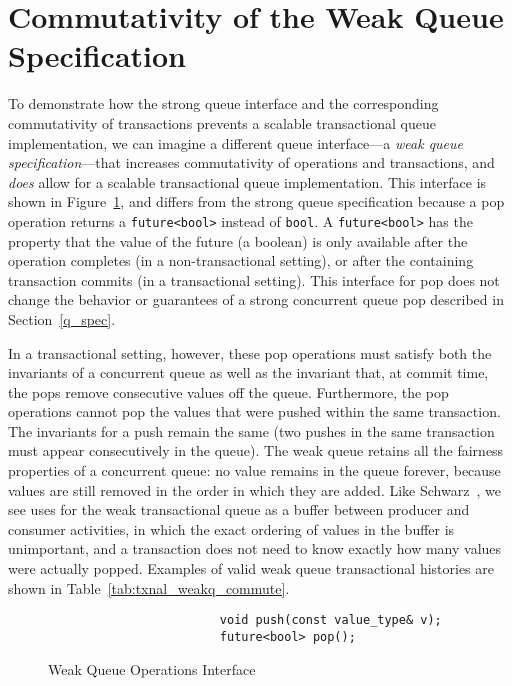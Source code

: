 \section{Commutativity of the Weak Queue Specification}
\label{wqueue}

To demonstrate how the strong queue interface and the corresponding commutativity of transactions prevents a scalable transactional queue implementation, we can imagine a different queue interface---a \emph{weak queue specification}---that increases commutativity of operations and transactions, and \emph{does} allow for a scalable transactional queue implementation. This interface is shown in Figure~\ref{fig:wq_interface}, and differs from the strong queue specification because a pop operation returns a \texttt{future<bool>} instead of \texttt{bool}. A \texttt{future<bool>} has the property that the value of the future (a boolean) is only available after the operation completes (in a non-transactional setting), or after the containing transaction commits (in a transactional setting). This interface for pop does not change the behavior or guarantees of a strong concurrent queue pop described in Section~\ref{q_spec}.
 
In a transactional setting, however, these pop operations must satisfy both the invariants of a concurrent queue as well as the invariant that, at commit time, the pops remove consecutive values off the queue. Furthermore, the pop operations cannot pop the values that were pushed within the same transaction. The invariants for a push remain the same (two pushes in the same transaction must appear consecutively in the queue). 
The weak queue retains all the fairness properties of a concurrent queue: no value remains in the queue forever, because values are still removed in the order in which they are added. Like Schwarz~\cite{schwarz}, we see uses for the weak transactional queue as a buffer between producer and consumer activities, in which the exact ordering of values in the buffer is unimportant, and a transaction does not need to know exactly how many values were actually popped. Examples of valid weak queue transactional histories are shown in Table~\ref{tab:txnal_weakq_commute}.  

\begin{figure}[t]
    \centering
    \begin{lstlisting}
                        void push(const value_type& v); 
                        future<bool> pop();                     
    \end{lstlisting}
    \caption{Weak Queue Operations Interface}
    \label{fig:wq_interface}
\end{figure}

